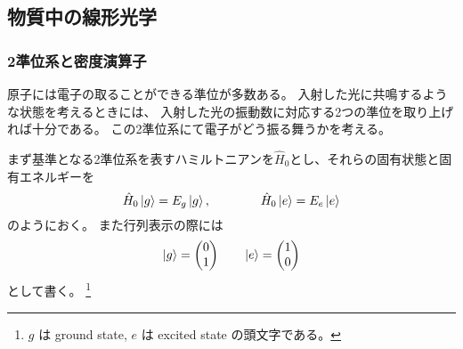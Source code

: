 \documentclass[11pt,dvipdfmx,a4paper]{jsarticle}
\begin{document}
\subsection{物質中の線形光学}
\subsubsection{2準位系と密度演算子}
原子には電子の取ることができる準位が多数ある。
入射した光に共鳴するような状態を考えるときには、
入射した光の振動数に対応する2つの準位を取り上げれば十分である。
この2準位系にて電子がどう振る舞うかを考える。

まず基準となる2準位系を表すハミルトニアンを\(\hat{H}_0\)とし、それらの固有状態と固有エネルギーを
\begin{equation}
	\hat{H}_0 \ket{g} = E_g \ket{g}, \qquad \qquad \hat{H}_0 \ket{e} = E_e \ket{e}
\end{equation}
のようにおく。
また行列表示の際には
\begin{equation}
	\ket{g} =
	\begin{pmatrix}
		0\\
		1
	\end{pmatrix}
	\qquad
	\ket{e} =
	\begin{pmatrix}
		1 \\
		0
	\end{pmatrix}
\end{equation}
として書く。
\footnote{\(g\) は ground state, \(e\) は excited state の頭文字である。}
\end{document}

